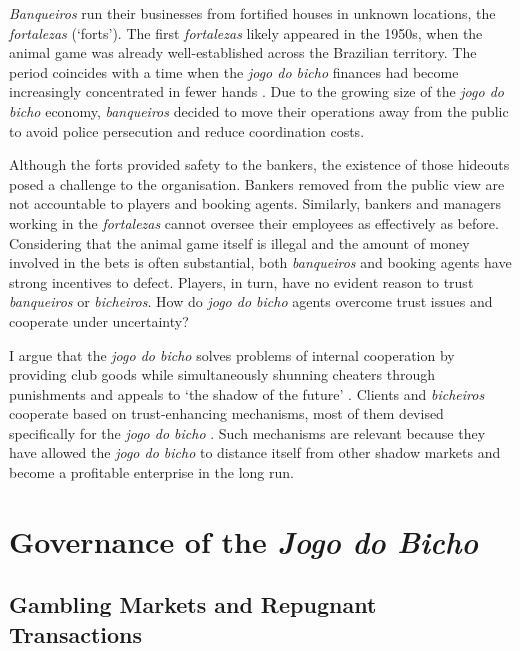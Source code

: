 \emph{Banqueiros} run their businesses from fortified houses in unknown locations, the \emph{fortalezas} (`forts'). The first \emph{fortalezas} likely appeared in the 1950s, when the animal game was already well-established across the Brazilian territory. The period coincides with a time when the \emph{jogo do bicho} finances had become increasingly concentrated in fewer hands \citep[259]{chazkel2011laws}. Due to the growing size of the \emph{jogo do bicho} economy, \emph{banqueiros} decided to move their operations away from the public to avoid police persecution and reduce coordination costs.

Although the forts provided safety to the bankers, the existence of those hideouts posed a challenge to the organisation. Bankers removed from the public view are not accountable to players and booking agents. Similarly, bankers and managers working in the \emph{fortalezas} cannot oversee their employees as effectively as before. Considering that the animal game itself is illegal and the amount of money involved in the bets is often substantial, both \emph{banqueiros} and booking agents have strong incentives to defect. Players, in turn, have no evident reason to trust \emph{banqueiros} or \emph{bicheiros}. How do \emph{jogo do bicho} agents overcome trust issues and cooperate under uncertainty?

I argue that the \emph{jogo do bicho} solves problems of internal cooperation by providing club goods \citep{buchanan1965economic, berman2008religion, berman2009radical, leeson2011government, roth2014prison} while simultaneously shunning cheaters through punishments and appeals to `the shadow of the future' \citep{axelrod1984evolution, axelrod1985achieving, bo2005cooperation, roth1978equilibrium}. Clients and \emph{bicheiros} cooperate based on trust-enhancing mechanisms, most of them devised specifically for the \emph{jogo do bicho} \citep{da1999aguias, magalhaes2005ganhou}. Such mechanisms are relevant because they have allowed the \emph{jogo do bicho} to distance itself from other shadow markets and become a profitable enterprise in the long run.

\section{Governance of the \emph{Jogo do Bicho}}
\label{sec:governance}

\subsection{Gambling Markets and Repugnant Transactions}
\label{sub:repugnance}

